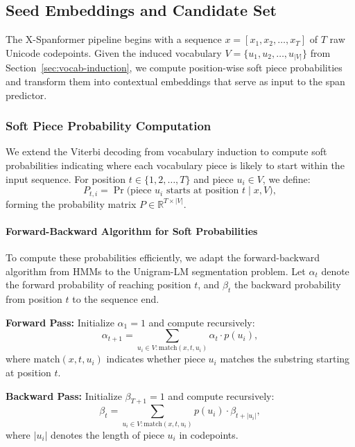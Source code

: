 \subsection{Seed Embeddings and Candidate Set}
\label{sec:seed-embeddings}

The X-Spanformer pipeline begins with a sequence \(x = [x_1, x_2, \ldots, x_T]\) of \(T\) raw Unicode codepoints. Given the induced vocabulary \(V = \{u_1, u_2, \ldots, u_{|V|}\}\) from Section~\ref{sec:vocab-induction}, we compute position-wise soft piece probabilities and transform them into contextual embeddings that serve as input to the span predictor.

\subsubsection{Soft Piece Probability Computation}
\label{sec:soft-piece-probs}

We extend the Viterbi decoding from vocabulary induction to compute soft probabilities indicating where each vocabulary piece is likely to start within the input sequence. For position \(t \in \{1, 2, \ldots, T\}\) and piece \(u_i \in V\), we define:
\begin{equation}
P_{t,i} = \Pr\bigl(\text{piece }u_i\text{ starts at position }t \mid x, V\bigr),
\label{eq:soft-piece-probability}
\end{equation}
forming the probability matrix \(P \in \mathbb{R}^{T \times |V|}\).

\paragraph{Forward-Backward Algorithm for Soft Probabilities}

To compute these probabilities efficiently, we adapt the forward-backward algorithm from HMMs to the Unigram-LM segmentation problem. Let \(\alpha_t\) denote the forward probability of reaching position \(t\), and \(\beta_t\) the backward probability from position \(t\) to the sequence end.

\textbf{Forward Pass:} Initialize \(\alpha_1 = 1\) and compute recursively:
\begin{equation}
\alpha_{t+1} = \sum_{u_i \in V : \text{match}(x, t, u_i)} \alpha_t \cdot p(u_i),
\label{eq:forward-pass}
\end{equation}
where \(\text{match}(x, t, u_i)\) indicates whether piece \(u_i\) matches the substring starting at position \(t\).

\textbf{Backward Pass:} Initialize \(\beta_{T+1} = 1\) and compute recursively:
\begin{equation}
\beta_t = \sum_{u_i \in V : \text{match}(x, t, u_i)} p(u_i) \cdot \beta_{t + |u_i|},
\label{eq:backward-pass}
\end{equation}
where \(|u_i|\) denotes the length of piece \(u_i\) in codepoints.


